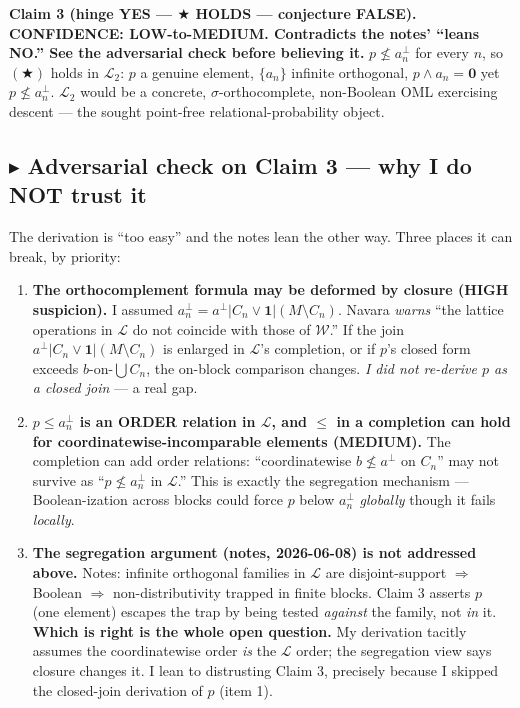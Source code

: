 \documentclass[11pt]{article}
\newcommand{\Lt}{\mathcal{L}_2}
\newcommand{\Wcal}{\mathcal{W}}
\newcommand{\Lcal}{\mathcal{L}}
\begin{document}
\begin{claimbox}
\noindent\textbf{Claim 3 (hinge YES --- $\bigstar$ HOLDS --- conjecture FALSE).
CONFIDENCE: LOW-to-MEDIUM. Contradicts the notes' ``leans NO.'' See the
adversarial check before believing it.}
$p\not\le a_n^\perp$ for every $n$, so $(\bigstar)$ holds in $\Lt$: $p$ a
genuine element, $\{a_n\}$ infinite orthogonal, $p\wedge a_n=\mathbf 0$ yet
$p\not\le a_n^\perp$. $\Lt$ would be a concrete, $\sigma$-orthocomplete,
non-Boolean OML exercising descent --- the sought point-free
relational-probability object.
\end{claimbox}

\subsection*{$\blacktriangleright$ Adversarial check on Claim 3 --- why I do
NOT trust it}

The derivation is ``too easy'' and the notes lean the other way. Three places
it can break, by priority:

\begin{enumerate}[label=\textbf{\arabic*.},leftmargin=2em]
  \item \textbf{The orthocomplement formula may be deformed by closure (HIGH
    suspicion).} I assumed $a_n^\perp=a^\perp|C_n\vee\mathbf 1|(M\setminus
    C_n)$. Navara \emph{warns} ``the lattice operations in $\Lcal$ do not
    coincide with those of $\Wcal$.'' If the join $a^\perp|C_n\vee\mathbf
    1|(M\setminus C_n)$ is enlarged in $\Lcal$'s completion, or if $p$'s closed
    form exceeds $b$-on-$\bigcup C_n$, the on-block comparison changes. \emph{I
    did not re-derive $p$ as a closed join} --- a real gap.
  \item \textbf{$p\le a_n^\perp$ is an ORDER relation in $\Lcal$, and $\le$ in a
    completion can hold for coordinatewise-incomparable elements (MEDIUM).} The
    completion can add order relations: ``coordinatewise $b\not\le a^\perp$ on
    $C_n$'' may not survive as ``$p\not\le a_n^\perp$ in $\Lcal$.'' This is
    exactly the segregation mechanism --- Boolean-ization across blocks could
    force $p$ below $a_n^\perp$ \emph{globally} though it fails \emph{locally}.
  \item \textbf{The segregation argument (notes, 2026-06-08) is not addressed
    above.} Notes: infinite orthogonal families in $\Lcal$ are disjoint-support
    $\Rightarrow$ Boolean $\Rightarrow$ non-distributivity trapped in finite
    blocks. Claim 3 asserts $p$ (one element) escapes the trap by being tested
    \emph{against} the family, not \emph{in} it. \textbf{Which is right is the
    whole open question.} My derivation tacitly assumes the coordinatewise
    order \emph{is} the $\Lcal$ order; the segregation view says closure changes
    it. I lean to distrusting Claim 3, precisely because I skipped the
    closed-join derivation of $p$ (item 1).
\end{enumerate}
\end{document}
